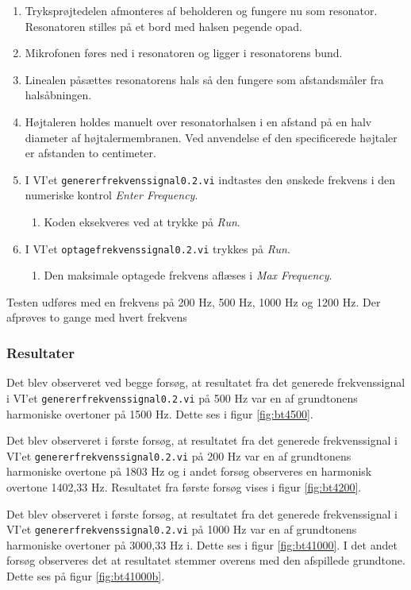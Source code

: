 			\begin{enumerate}
				\item Tryksprøjtedelen afmonteres af beholderen og fungere nu som resonator. Resonatoren stilles på et bord med halsen pegende opad. 
				\item Mikrofonen føres ned i resonatoren og ligger i resonatorens bund. 
				\item Linealen påsættes resonatorens hals så den fungere som afstandsmåler fra halsåbningen.
				\item Højtaleren holdes manuelt over resonatorhalsen i en afstand på en halv diameter af højtalermembranen. Ved anvendelse ef den specificerede højtaler er afstanden to centimeter. 
				\item I VI'et \texttt{genererfrekvenssignal0.2.vi} indtastes den ønskede frekvens i den numeriske kontrol \textit{Enter Frequency}. 
					\begin{enumerate}
						\item Koden eksekveres ved at trykke på \textit{Run}. 
					\end{enumerate} 
				\item I VI'et \texttt{optagefrekvenssignal0.2.vi} trykkes på \textit{Run}. 
					\begin{enumerate}
						\item Den maksimale optagede frekvens aflæses i \textit{Max Frequency}. 
					\end{enumerate}	 	
			\end{enumerate}
			
			
			Testen udføres med en frekvens på 200 Hz, 500 Hz, 1000 Hz og 1200 Hz. Der afprøves to gange med hvert frekvens  
			
			\subsubsection{Resultater}
			Det blev observeret ved begge forsøg, at resultatet fra det generede frekvenssignal i VI'et \texttt{genererfrekvenssignal0.2.vi} på 500 Hz var en af grundtonens harmoniske overtoner på 1500 Hz. Dette ses i figur \ref{fig:bt4500}. 

			 Det blev observeret i første forsøg, at resultatet fra det generede frekvenssignal i VI'et \texttt{genererfrekvenssignal0.2.vi} på 200 Hz var en af grundtonens harmoniske overtone på 1803 Hz og i andet forsøg observeres en harmonisk overtone 1402,33 Hz. Resultatet fra første forsøg vises i figur \ref{fig:bt4200}.
			 
			 Det blev observeret i første forsøg, at resultatet fra det generede frekvenssignal i VI'et \texttt{genererfrekvenssignal0.2.vi} på 1000 Hz var en af grundtonens harmoniske overtoner på 3000,33 Hz i. Dette ses i figur \ref{fig:bt41000}. I det andet forsøg observeres det at resultatet stemmer overens med den afspillede grundtone. Dette ses på figur \ref{fig:bt41000b}.  
			 
